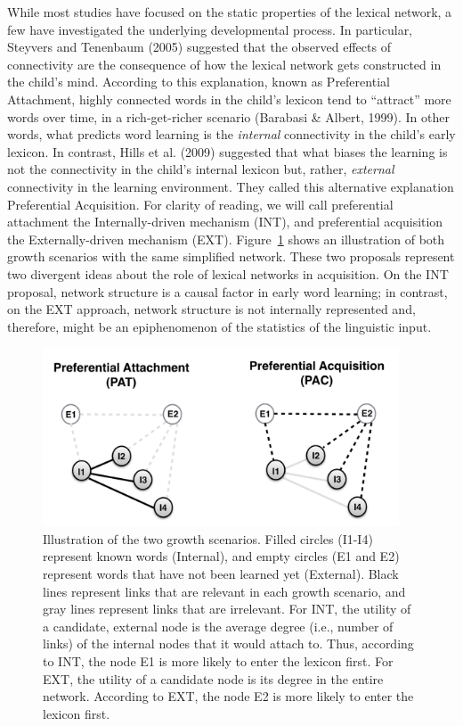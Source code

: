 \documentclass[english,floatsintext,man]{apa6}
\theoremstyle{definition}
\theoremstyle{definition}
\theoremstyle{definition}
\theoremstyle{remark}
\begin{document}
While most studies have focused on the static properties of the lexical
network, a few have investigated the underlying developmental process.
In particular, Steyvers and Tenenbaum (2005) suggested that the observed
effects of connectivity are the consequence of how the lexical network
gets constructed in the child's mind. According to this explanation,
known as Preferential Attachment, highly connected words in the child's
lexicon tend to \enquote{attract} more words over time, in a
rich-get-richer scenario (Barabasi \& Albert, 1999). In other words,
what predicts word learning is the \emph{internal} connectivity in the
child's early lexicon. In contrast, Hills et al. (2009) suggested that
what biases the learning is not the connectivity in the child's internal
lexicon but, rather, \emph{external} connectivity in the learning
environment. They called this alternative explanation Preferential
Acquisition. For clarity of reading, we will call preferential
attachment the Internally-driven mechanism (INT), and preferential
acquisition the Externally-driven mechanism (EXT).
Figure~\ref{fig:growth} shows an illustration of both growth scenarios
with the same simplified network. These two proposals represent two
divergent ideas about the role of lexical networks in acquisition. On
the INT proposal, network structure is a causal factor in early word
learning; in contrast, on the EXT approach, network structure is not
internally represented and, therefore, might be an epiphenomenon of the
statistics of the linguistic input.

\begin{figure}

{\centering \includegraphics[width=400px]{figs/growth2} 

}

\caption{Illustration of the two growth scenarios. Filled circles (I1-I4) represent known words (Internal), and empty circles (E1 and E2) represent words that have not been learned yet (External). Black lines represent links that are relevant in each growth scenario, and gray lines represent links that are irrelevant. For INT, the utility of a candidate, external node is the average degree (i.e., number of links) of the internal nodes that it would attach to. Thus, according to INT, the node E1 is more likely to enter the lexicon first. For EXT, the utility of a candidate node is its degree in the entire network. According to EXT, the node E2 is more likely to enter the lexicon first.}\label{fig:growth}
\end{figure}
\end{document}
